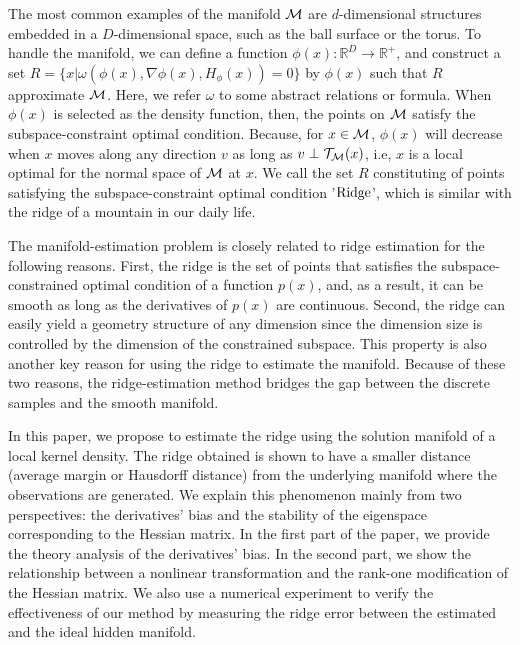 \documentclass[aos,preprint]{imsart}
\theoremstyle{remark}
\begin{document}
The most common examples of the manifold $\cal M$ are $d$-dimensional structures embedded in a $D$-dimensional space, such as the ball surface or the torus. To handle the manifold, we can define a function $\phi(x): {\mathbb R}^D\rightarrow {\mathbb R}^+$, and construct a set $R = \{x | \omega (\phi(x),\nabla \phi(x), H_\phi(x))=0 \}$ by $\phi(x)$ such that $R$ approximate $\cal M$. Here, we refer $\omega$ to some abstract relations or formula. When $\phi(x)$ is selected as the density function, then, the points on $\cal M$ satisfy the subspace-constraint optimal condition. Because, for $x\in \cal M$, $\phi(x)$ will decrease when $x$ moves along any direction $v$ as long as $v\perp {\cal T}_{\cal M}(x)$, i.e, $x$ is a local optimal for the normal space of $\cal M$ at $x$. We call the set $R$ constituting of points satisfying the subspace-constraint optimal condition '$\rm Ridge$', which is similar with the ridge of a mountain in our daily life.





The manifold-estimation problem is closely related to ridge estimation for the following reasons. First, the ridge is the set of points that satisfies the subspace-constrained optimal condition of a function $p(x)$, and, as a result, it can be smooth as long as the derivatives of $p(x)$ are continuous. Second, the ridge can easily yield a geometry structure of any dimension since the dimension size is controlled by the dimension of the constrained subspace. This property is also another key reason for using the ridge to estimate the manifold. Because of these two reasons, the ridge-estimation method bridges the gap between the discrete samples and the smooth manifold.

In this paper, we propose to estimate the ridge using the solution manifold of a local kernel density. The ridge obtained is shown to have a smaller distance (average margin or Hausdorff distance) from the underlying manifold where the observations are generated. We explain this phenomenon mainly from two perspectives: the derivatives' bias and the stability of the eigenspace corresponding to the Hessian matrix. In the first part of the paper, we provide the theory analysis of the derivatives' bias. In the second part, we show the relationship between a nonlinear transformation and the rank-one modification of the Hessian matrix. We also use a numerical experiment to verify the effectiveness of our method by measuring the ridge error between the estimated and the ideal hidden manifold.
\end{document}
